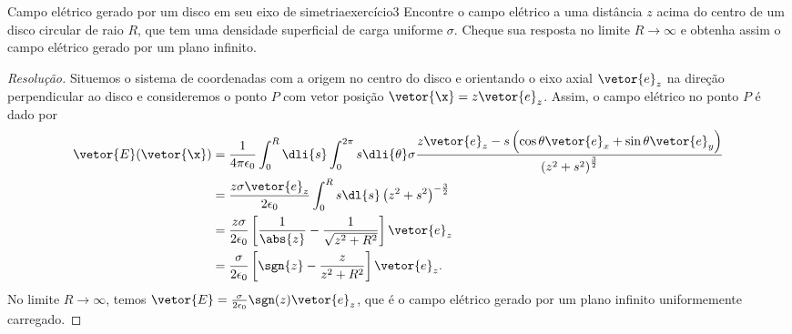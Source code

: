 \begin{exercício}{Campo elétrico gerado por um disco em seu eixo de simetria}{exercício3}
    Encontre o campo elétrico a uma distância \(z\) acima do centro de um disco circular de raio \(R\), que tem uma densidade superficial de carga uniforme \(\sigma\). Cheque sua resposta no limite \(R \to \infty\) e obtenha assim o campo elétrico gerado por um plano infinito.
\end{exercício}
\begin{proof}[Resolução]
    Situemos o sistema de coordenadas com a origem no centro do disco e orientando o eixo axial \(\vetor{e}_z\) na direção perpendicular ao disco e consideremos o ponto \(P\) com vetor posição \(\vetor{\x} = z\vetor{e}_z\). Assim, o campo elétrico no ponto \(P\) é dado por
    \begin{align*}
        \vetor{E}(\vetor{\x}) &= \frac1{4\pi \epsilon_0} \int_0^R\dli{s} \int_0^{2\pi} s\dli{\theta} \sigma\frac{z\vetor{e}_z - s\left(\cos\theta \vetor{e}_x + \sin\theta \vetor{e}_y\right)}{\left(z^2 + s^2\right)^{\frac32}}\\
                              &= \frac{z \sigma\vetor{e}_z}{2\epsilon_0} \int_0^R s\dl{s} \left(z^2 + s^2\right)^{-\frac32}\\
                              &= \frac{z \sigma}{2 \epsilon_0}\left[\frac1{\abs{z}} - \frac1{\sqrt{z^2 + R^2}}\right]\vetor{e}_z\\
                              &= \frac{\sigma}{2 \epsilon_0}\left[\sgn{z} - \frac{z}{z^2 + R^2}\right]\vetor{e}_z.
    \end{align*}
    No limite \(R \to \infty\), temos \(\vetor{E} = \frac{\sigma}{2 \epsilon_0} \sgn(z)\vetor{e}_z\), que é o campo elétrico gerado por um plano infinito uniformemente carregado.
\end{proof}
